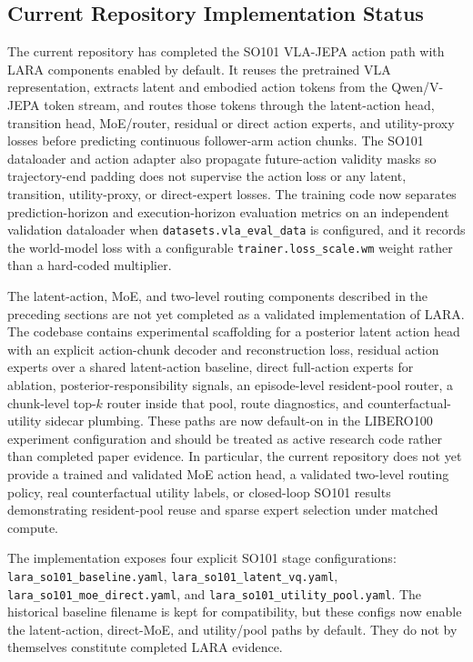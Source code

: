 \documentclass[10pt]{article}
\begin{document}
\subsection*{Current Repository Implementation Status}

The current repository has completed the SO101 VLA-JEPA action path with LARA
components enabled by default. It reuses the pretrained VLA representation,
extracts latent and embodied action tokens from the Qwen/V-JEPA token stream,
and routes those tokens through the latent-action head, transition head,
MoE/router, residual or direct action experts, and utility-proxy losses before
predicting continuous follower-arm action chunks.
The SO101 dataloader and action adapter also propagate future-action validity
masks so trajectory-end padding does not supervise the action loss or any
latent, transition, utility-proxy, or direct-expert losses. The
training code now separates prediction-horizon and execution-horizon evaluation
metrics on an independent validation dataloader when
\texttt{datasets.vla\_eval\_data} is configured, and it records the
world-model loss with a configurable \texttt{trainer.loss\_scale.wm} weight
rather than a hard-coded multiplier.

The latent-action, MoE, and two-level routing components described in the
preceding sections are not yet completed as a validated implementation of
LARA. The codebase contains experimental scaffolding for a posterior latent
action head with an explicit action-chunk decoder and reconstruction loss,
residual action experts over a shared latent-action baseline, direct full-action
experts for ablation, posterior-responsibility signals, an
episode-level resident-pool router, a chunk-level top-$k$ router inside that
pool, route diagnostics, and counterfactual-utility sidecar plumbing. These
paths are now default-on in the LIBERO100 experiment configuration and should be treated as active research code rather
than completed paper evidence. In particular, the current repository does not
yet provide a trained and validated MoE action head, a validated two-level
routing policy, real counterfactual utility labels, or closed-loop SO101
results demonstrating resident-pool reuse and sparse expert selection under
matched compute.

The implementation exposes four explicit SO101 stage configurations:
\texttt{lara\_so101\_baseline.yaml}, \texttt{lara\_so101\_latent\_vq.yaml},
\texttt{lara\_so101\_moe\_direct.yaml}, and
\texttt{lara\_so101\_utility\_pool.yaml}. The historical baseline filename is
kept for compatibility, but these configs now enable the latent-action,
direct-MoE, and utility/pool paths by default. They do not by themselves
constitute completed LARA evidence.
\end{document}
